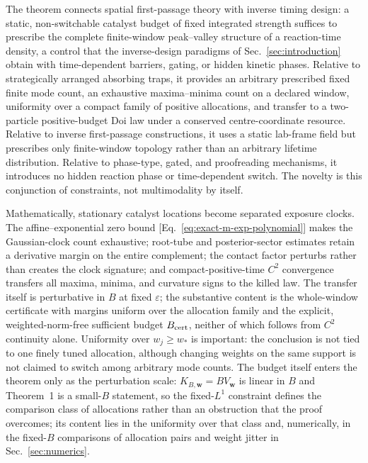 \documentclass[aps,physrev,reprint,amsmath,amssymb,longbibliography,floatfix]{revtex4-2}
\begin{document}
The theorem connects spatial first-passage theory with inverse timing
design: a static, non-switchable catalyst budget of fixed integrated strength
suffices to prescribe the complete finite-window peak--valley structure of a
reaction-time density, a control that the inverse-design paradigms of
Sec.~\ref{sec:introduction} obtain with time-dependent barriers, gating, or
hidden kinetic phases.  Relative to strategically arranged absorbing traps,
it provides an arbitrary prescribed fixed finite mode count, an exhaustive
maxima--minima count on a declared window, uniformity over a compact family
of positive allocations, and transfer to a two-particle positive-budget Doi
law under a conserved centre-coordinate resource.  Relative to inverse
first-passage constructions, it uses a static lab-frame field but prescribes
only finite-window topology rather than an arbitrary lifetime distribution.
Relative to phase-type, gated, and proofreading mechanisms, it introduces no
hidden reaction phase or time-dependent switch.  The novelty is this
conjunction of constraints, not multimodality by itself.

Mathematically, stationary catalyst locations become separated exposure
clocks.  The affine--exponential zero bound
[Eq.~\eqref{eq:exact-m-exp-polynomial}] makes the Gaussian-clock count
exhaustive; root-tube and posterior-sector estimates retain a derivative
margin on the entire complement; the contact factor perturbs rather than
creates the clock signature; and compact-positive-time \(C^2\) convergence
transfers all maxima, minima, and curvature signs to the killed law.
The transfer itself is perturbative in \(B\) at fixed \(\varepsilon\); the
substantive content is the whole-window certificate with margins uniform
over the allocation family and the explicit, weighted-norm-free sufficient
budget \(B_{\rm cert}\), neither of which follows from \(C^2\) continuity
alone.
Uniformity over \(w_j\ge w_*\) is important: the conclusion is not tied to one
finely tuned allocation, although changing weights on the same support is not
claimed to switch among arbitrary mode counts.
The budget itself enters the theorem only as the perturbation scale:
\(K_{B,\bm w}=BV_{\bm w}\) is linear in \(B\) and Theorem~1 is a
small-\(B\) statement, so the fixed-\(L^1\) constraint defines the
comparison class of allocations rather than an obstruction that the proof
overcomes; its content lies in the uniformity over that class and, numerically,
in the fixed-\(B\) comparisons of allocation pairs and weight jitter in
Sec.~\ref{sec:numerics}.
\end{document}
